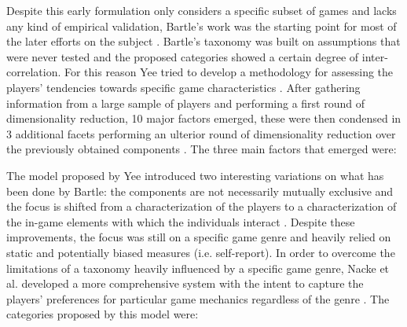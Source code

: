 
Despite this early formulation only considers a specific subset of games and lacks any kind of empirical validation, Bartle's work was the starting point for most of the later efforts on the subject \cite{bartle1996hearts}. Bartle's taxonomy was built on assumptions that were never tested and the proposed categories showed a certain degree of inter-correlation. For this reason Yee tried to develop a methodology for assessing the players’ tendencies towards specific game characteristics \cite{yee2006motivations}. After gathering information from a large sample of players and performing a first round of dimensionality reduction, 10 major factors emerged, these were then condensed in 3 additional facets performing an ulterior round of dimensionality reduction over the previously obtained components \cite{yee2006motivations}. The three main factors that emerged were: 

The model proposed by Yee introduced two interesting variations on what has been done by Bartle: the components are not necessarily mutually exclusive and the focus is shifted from a characterization of the players to a characterization of the in-game elements with which the individuals interact \cite{bartle1996hearts,yee2006motivations}. Despite these improvements, the focus was still on a specific game genre and heavily relied on static and potentially biased measures (i.e. self-report). In order to overcome the limitations of a taxonomy heavily influenced by a specific game genre, Nacke et al. developed a more comprehensive system with the intent to capture the players’ preferences for particular game mechanics regardless of the genre \cite{nacke2011brainhex}. The categories proposed by this model were: 

